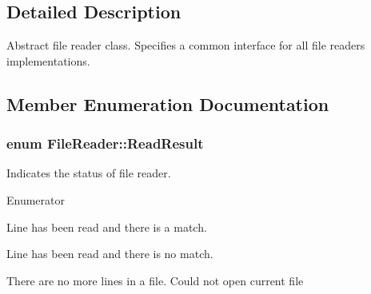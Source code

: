 \subsection{Detailed Description}
Abstract file reader class. Specifies a common interface for all file readers implementations. 

\subsection{Member Enumeration Documentation}
\hypertarget{class_file_reader_a8e801198c62f657dd1dff8fd8dbe796f}{
\subsubsection[{Read\-Result}]{\setlength{\rightskip}{0pt plus 5cm}enum {\bf File\-Reader\-::\-Read\-Result}}}\label{class_file_reader_a8e801198c62f657dd1dff8fd8dbe796f}


Indicates the status of file reader. 

\begin{Desc}
\item[Enumerator]\par
\begin{description}
\item[{\em 
\hypertarget{class_file_reader_a8e801198c62f657dd1dff8fd8dbe796fae9f73ad13d7812bd5c4d0e6bd4c98757}{F\-R\-\_\-\-B\-A\-D}\label{class_file_reader_a8e801198c62f657dd1dff8fd8dbe796fae9f73ad13d7812bd5c4d0e6bd4c98757}
}]Line has been read and there is a match. \item[{\em 
\hypertarget{class_file_reader_a8e801198c62f657dd1dff8fd8dbe796fa677d417bbb7f32f5fc9c07717bf7a036}{F\-R\-\_\-\-N\-O\-\_\-\-M\-O\-R\-E}\label{class_file_reader_a8e801198c62f657dd1dff8fd8dbe796fa677d417bbb7f32f5fc9c07717bf7a036}
}]Line has been read and there is no match. \item[{\em 
\hypertarget{class_file_reader_a8e801198c62f657dd1dff8fd8dbe796fa2d89c82783e7e6491174d0c1a1302ffe}{F\-R\-\_\-\-O\-P\-E\-N\-\_\-\-F\-A\-I\-L\-E\-D}\label{class_file_reader_a8e801198c62f657dd1dff8fd8dbe796fa2d89c82783e7e6491174d0c1a1302ffe}
}]There are no more lines in a file. Could not open current file \end{description}
\end{Desc}


